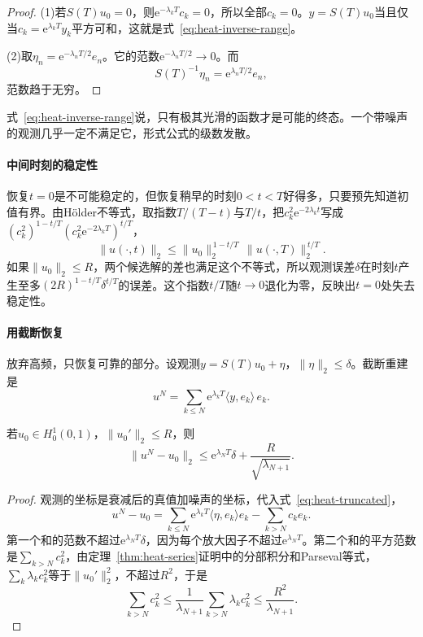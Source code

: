 \begin{proof}
(1)若$S(T)u_0=0$，则$\mathrm{e}^{-\lambda_kT}c_k=0$，所以全部$c_k=0$。$y=S(T)u_0$当且仅当$c_k=\mathrm{e}^{\lambda_kT}y_k$平方可和，这就是式~\eqref{eq:heat-inverse-range}。

(2)取$\eta_n=\mathrm{e}^{-\lambda_nT/2}e_n$。它的范数$\mathrm{e}^{-\lambda_nT/2}\to0$。而
\[
 S(T)^{-1}\eta_n=\mathrm{e}^{\lambda_nT/2}e_n,
\]
范数趋于无穷。
\end{proof}

式~\eqref{eq:heat-inverse-range}说，只有极其光滑的函数才是可能的终态。一个带噪声的观测几乎一定不满足它，形式公式的级数发散。

\paragraph{中间时刻的稳定性}
恢复$t=0$是不可能稳定的，但恢复稍早的时刻$0<t<T$好得多，只要预先知道初值有界。由Hölder不等式，取指数$T/(T-t)$与$T/t$，把$c_k^2\mathrm{e}^{-2\lambda_kt}$写成$(c_k^2)^{1-t/T}(c_k^2\mathrm{e}^{-2\lambda_kT})^{t/T}$，
\begin{equation}
 \lVert u(\cdot,t)\rVert_2\leq\lVert u_0\rVert_2^{\,1-t/T}\,\lVert u(\cdot,T)\rVert_2^{\,t/T} .
 \label{eq:heat-log-convexity}
\end{equation}
如果$\lVert u_0\rVert_2\leq R$，两个候选解的差也满足这个不等式，所以观测误差$\delta$在时刻$t$产生至多$(2R)^{1-t/T}\delta^{t/T}$的误差。这个指数$t/T$随$t\to0$退化为零，反映出$t=0$处失去稳定性。

\paragraph{用截断恢复}
放弃高频，只恢复可靠的部分。设观测$y=S(T)u_0+\eta$，$\lVert\eta\rVert_2\leq\delta$。截断重建是
\begin{equation}
 u^{N}=\sum_{k\leq N}\mathrm{e}^{\lambda_kT}\langle y,e_k\rangle\,e_k .
 \label{eq:heat-truncated}
\end{equation}

\begin{theorem}[截断重建的误差]
\label{thm:heat-truncation}
若$u_0\in H^1_0(0,1)$，$\lVert u_0'\rVert_2\leq R$，则
\begin{equation}
 \lVert u^{N}-u_0\rVert_2\leq\mathrm{e}^{\lambda_NT}\delta+\frac{R}{\sqrt{\lambda_{N+1}}} .
 \label{eq:heat-truncation-error}
\end{equation}
\end{theorem}

\begin{proof}
观测的坐标是衰减后的真值加噪声的坐标，代入式~\eqref{eq:heat-truncated}，
\[
 u^{N}-u_0=\sum_{k\leq N}\mathrm{e}^{\lambda_kT}\langle\eta,e_k\rangle e_k-\sum_{k>N}c_ke_k .
\]
第一个和的范数不超过$\mathrm{e}^{\lambda_NT}\delta$，因为每个放大因子不超过$\mathrm{e}^{\lambda_NT}$。第二个和的平方范数是$\sum_{k>N}c_k^2$，由定理~\ref{thm:heat-series}证明中的分部积分和Parseval等式，$\sum_k\lambda_kc_k^2$等于$\lVert u_0'\rVert_2^2$，不超过$R^2$，于是
\[
 \sum_{k>N}c_k^2\leq\frac{1}{\lambda_{N+1}}\sum_{k>N}\lambda_kc_k^2\leq\frac{R^2}{\lambda_{N+1}} .
\]
\end{proof}

